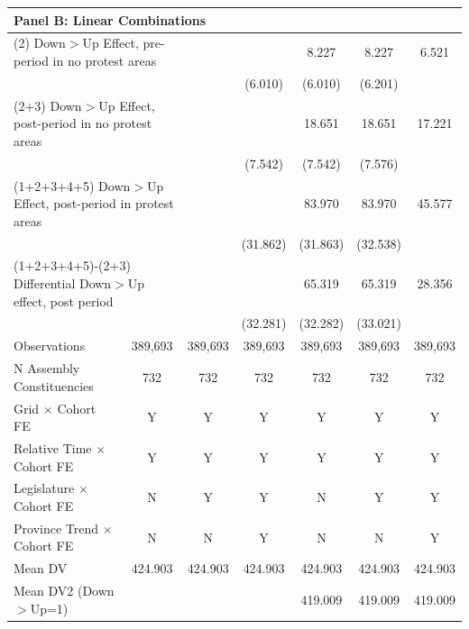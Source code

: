 {\begin{tabular}{l*{6}{c}}
\hline
\multicolumn{7}{l}{\textbf{Panel B: Linear Combinations}} \\ \hline
\multicolumn{2}{l}{(2) Down$>$Up Effect, pre-period in no protest areas}&            &            &       8.227&       8.227&       6.521\\
            &            &            &     (6.010)&     (6.010)&     (6.201)\\
\multicolumn{2}{l}{(2+3) Down$>$Up Effect, post-period in no protest areas}&            &            &18.651\sym{**}&18.651\sym{**}&17.221\sym{**}\\
            &            &            &     (7.542)&     (7.542)&     (7.576)\\
\multicolumn{2}{l}{(1+2+3+4+5) Down$>$Up Effect, post-period in protest areas}&            &            &83.970\sym{***}&83.970\sym{***}&      45.577\\
            &            &            &    (31.862)&    (31.863)&    (32.538)\\
\multicolumn{2}{l}{(1+2+3+4+5)-(2+3) Differential Down$>$Up effect, post period}&            &            &65.319\sym{**}&65.319\sym{**}&      28.356\\
            &            &            &    (32.281)&    (32.282)&    (33.021)\\



\hline
Observations&     389,693&     389,693&     389,693&     389,693&     389,693&     389,693\\
N Assembly Constituencies&         732&         732&         732&         732&         732&         732\\
Grid $\times$ Cohort FE&           Y&           Y&           Y&           Y&           Y&           Y\\
Relative Time $\times$ Cohort FE&           Y&           Y&           Y&           Y&           Y&           Y\\
Legislature $\times$ Cohort FE&           N&           Y&           Y&           N&           Y&           Y\\
Province Trend $\times$ Cohort FE&           N&           N&           Y&           N&           N&           Y\\
Mean DV     &     424.903&     424.903&     424.903&     424.903&     424.903&     424.903\\
Mean DV2 (Down$>$Up=1)&            &            &            &     419.009&     419.009&     419.009\\
\hline
\end{tabular}
}
